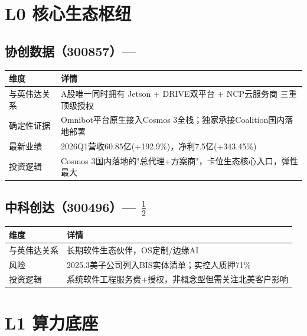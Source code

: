 \section{L0 核心生态枢纽}

\subsection{协创数据（300857）--- \starfive{}}

\begin{table}[H]
\centering\small
\renewcommand{\arraystretch}{1.3}
\begin{tabularx}{\textwidth}{l X}
\toprule
\textbf{维度} & \textbf{详情} \\
\midrule
与英伟达关系 & A股唯一同时拥有 Jetson + DRIVE双平台 + NCP云服务商 三重顶级授权 \\
确定性证据 & Omnibot平台原生接入Cosmos 3全栈；独家承接Coalition国内落地部署 \\
最新业绩 & 2026Q1营收60.85亿(+192.9\%)，净利7.5亿(+343.45\%) \\
投资逻辑 & Cosmos 3国内落地的"总代理+方案商"，卡位生态核心入口，弹性最大 \\
\bottomrule
\end{tabularx}
\end{table}

\subsection{中科创达（300496）--- \starthree{}$\frac{1}{2}$}

\begin{table}[H]
\centering\small
\renewcommand{\arraystretch}{1.3}
\begin{tabularx}{\textwidth}{l X}
\toprule
\textbf{维度} & \textbf{详情} \\
\midrule
与英伟达关系 & 长期软件生态伙伴，OS定制/边缘AI \\
风险 & \textcolor{riskred}{2025.3美子公司列入BIS实体清单}；实控人质押71\% \\
投资逻辑 & 系统软件工程服务费+授权，非概念型但需关注北美客户影响 \\
\bottomrule
\end{tabularx}
\end{table}

\section{L1 算力底座}

